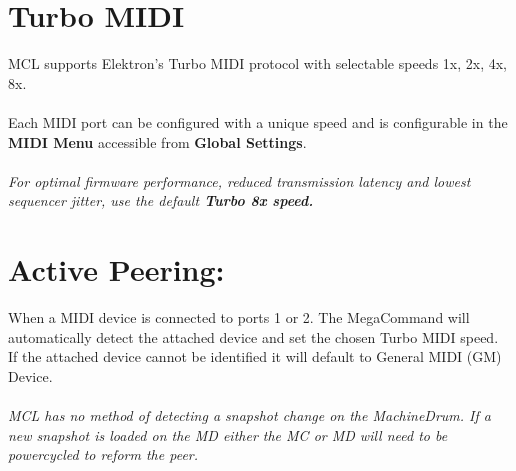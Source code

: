 \section{Turbo MIDI}

MCL supports Elektron's Turbo MIDI protocol with selectable speeds 1x, 2x, 4x, 8x.\\
\\
Each MIDI port can be configured with a unique speed and is configurable in the \textbf{MIDI Menu} accessible from \textbf{Global Settings}.
\\
\\
\textit{For optimal firmware performance, reduced transmission latency and lowest sequencer jitter, use the default \textbf{Turbo 8x speed.}}

\section{Active Peering:}

When a MIDI device is connected to ports 1 or 2. The MegaCommand will automatically detect the attached device and set the chosen Turbo MIDI speed. If the attached device cannot be identified it will default to General MIDI (GM) Device.\\
\\
\textit{MCL has no method of detecting a snapshot change on the MachineDrum. If a new snapshot is loaded on the MD either the MC or MD will need to be powercycled to reform the peer.}


 
